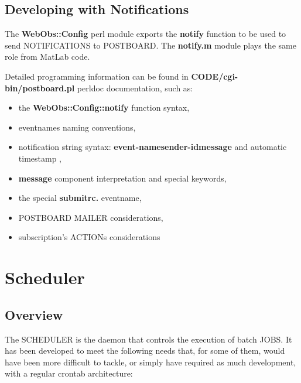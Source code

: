 \subsection{Developing with Notifications}

The \textbf{WebObs::Config} perl module exports the \textbf{notify} function to be used to send NOTIFICATIONS to POSTBOARD.
The \textbf{notify.m} module plays the same role from MatLab code. 

Detailed programming information can be found in \textbf{CODE/cgi-bin/postboard.pl} perldoc documentation, such as:

\begin{itemize}
\item   the \textbf{WebObs::Config::notify} function syntax,
\item   eventnames naming conventions,
\item   notification string syntax: \textbf{event-name}\textbar\textbf{sender-id}\textbar\textbf{message} and automatic timestamp ,
\item   \textbf{message} component interpretation and special keywords, 
\item   the special \textbf{submitrc.} eventname,
\item   POSTBOARD MAILER considerations,
\item   subscription's ACTIONs considerations
\end{itemize}


\section{Scheduler}
\label{scheduler}

\subsection{Overview}

The SCHEDULER is the daemon that controls the execution of \webobs batch JOBS. It has been developed to meet the following needs that,
for some of them, would have been more difficult to tackle, or simply have required as much development, with a regular crontab architecture:

